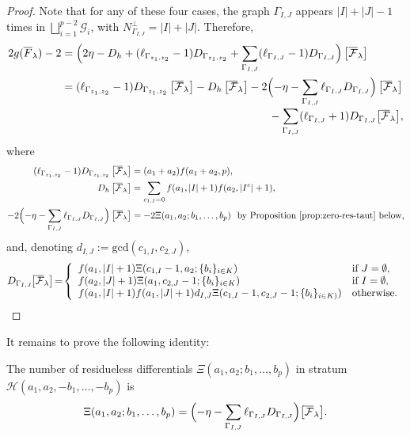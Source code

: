\begin{proof}
Note that for any of these four cases, the graph $\Gamma_{I,J}$ appears $|I|+|J|-1$ times in $\bigsqcup_{i=1}^{p-2}\mathcal{G}_i$, with $N_{\Gamma_{I,J}}^\bot=|I|+|J|$. Therefore,
\begin{align*}
2g (\overline{F}_\lambda)-2 & = \Bigl( 2\eta -D_h + (\ell_{\Gamma_{z_1,z_2}}-1)D_{\Gamma_{z_1,z_2}} +\sum_{\Gamma_{I,J}}(\ell_{\Gamma_{I,J}}-1)D_{\Gamma_{I,J}} \Bigr)\left[\overline{\mathcal F}_\lambda\right]\\
& = (\ell_{\Gamma_{z_1,z_2}}-1)D_{\Gamma_{z_1,z_2}}\left[\overline{\mathcal F}_\lambda\right] - D_h\left[\overline{\mathcal F}_\lambda\right]-2\Bigl(-\eta-\sum_{\Gamma_{I,J}}\ell_{\Gamma_{I,J}}D_{\Gamma_{I,J}}\Bigr)\left[\overline{\mathcal F}_\lambda\right]\\[-3pt]
&\hspace*{6.6cm} -\sum_{\Gamma_{I,J}}(\ell_{\Gamma_{I,J}}+1)D_{\Gamma_{I,J}}\bigl[\overline{\mathcal F}_\lambda\bigr],
\end{align*}
where
\begin{align*}
(\ell_{\Gamma_{z_1,z_2}}-1)D_{\Gamma_{z_1,z_2}}\left[\overline{\mathcal F}_\lambda\right] & = (a_1+a_2)f(a_1+a_2,p),\\
D_h \left[\overline{\mathcal F}_\lambda\right] & = \sum_{c_{1,I}=0} f(a_1,|I|+1)f(a_2,|I^c|+1),\\
-2\Bigl(-\eta-\sum_{\Gamma_{I,J}} \ell_{\Gamma_{I,J}} D_{\Gamma_{I,J}}\Bigr)\left[\overline{\mathcal F}_\lambda\right] & = -2 \Xi(a_1,a_2; b_1,\ldots, b_p) \ \ \text{by Proposition \ref{prop:zero-res-taut} below,}
\end{align*}
and, denoting $d_{I,J}:=\text{gcd}(c_{1,I},c_{2,J})$,
\begin{equation*}
D_{\Gamma_{I,J}}\mkern-2mu \bigl[\overline{\mathcal F}_\lambda\bigr] \!=\!
\left\{
\begin{array}{ll}
f(a_1,|I|+1)\Xi(c_{1,I}-1,a_2;\{b_i\}_{i\in K}) & \text{if } J=\emptyset,\\
f(a_2,|J|+1)\Xi(a_1,c_{2,J}-1;\{b_i\}_{i\in K}) & \text{if } I=\emptyset,\\
f(a_1,|I|+1)f(a_1,|J|+1)d_{I,J}\Xi(c_{1,I}-1,c_{2,J}-1;\{b_i\}_{i\in K)}) & \text{otherwise.}
\end{array}\right.
\end{equation*}
\end{proof}
It remains to prove the following identity:

\begin{prop}
\label{prop:zero-res-taut}
The number of residueless differentials $\Xi(a_1,a_2;b_1,\ldots,b_p)$ in stratum $\mathcal{H}(a_1, a_2, -b_1,\ldots, -b_p)$ is
\begin{equation}
\label{eqn:zero-res-taut}
\Xi(a_1,a_2;b_1,\ldots,b_p)=\Bigl(-\eta-\sum_{\Gamma_{I,J}}\ell_{\Gamma_{I,J}} D_{\Gamma_{I,J}}\Bigr)\bigl[\overline{\mathcal{F}}_{\lambda}\bigr].
\end{equation}
\end{prop}

